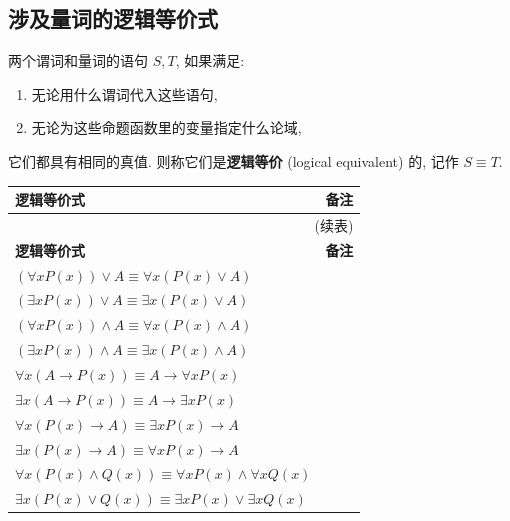 \documentclass[10pt,UTF8]{book} %
\begin{document}
\newpage
\subsection{涉及量词的逻辑等价式}

\begin{definition}
    两个谓词和量词的语句 $S,T$, 如果满足:
    \begin{enumerate}[label={${\arabic*}^\circ$}, itemsep=0pt]
        \item 无论用什么谓词代入这些语句,
        \item 无论为这些命题函数里的变量指定什么论域,
    \end{enumerate}
    它们都具有相同的真值. 则称它们是\textbf{逻辑等价} (logical equivalent) 的,
    记作 $S \equiv T$.
\end{definition}

{
\begin{longtable}{p{}p{}}
    \toprule 
    \textbf{逻辑等价式} & \textbf{备注} \\ 
    \midrule
    \endfirsthead
    \multicolumn{2}{r}{(续表)} \\
    \toprule 
    \textbf{逻辑等价式} & \textbf{备注} \\ 
    \midrule
    \endhead

    \bottomrule
    \endfoot

    $(\forall x P(x)) \vee A \equiv \forall x \left(
        P(x) \vee A
    \right)$ & \\
    $(\exists x P(x)) \vee A \equiv \exists x \left(
        P(x) \vee A
    \right)$ \\ 
    $(\forall x P(x)) \wedge A \equiv \forall x \left(
        P(x) \wedge A
    \right)$ & \\
    $(\exists x P(x)) \wedge A \equiv \exists x \left(
        P(x) \wedge A
    \right)$ \\ 
    $\forall x \left( A \to P(x) \right) \equiv A \to \forall x P(x)$ \\ 
    $\exists x \left( A \to P(x) \right) \equiv A \to \exists x P(x)$ \\ 
    $\forall x \left( P(x) \to A \right) \equiv \exists x P(x) \to A$ \\ 
    $\exists x \left( P(x) \to A \right) \equiv \forall x P(x) \to A$ \\ 
    $\forall x \left( P(x) \wedge Q(x) \right) \equiv
    \forall x P(x) \wedge \forall x Q(x)$ \\ 
    $\exists x \left( P(x) \vee Q(x) \right) \equiv
    \exists x P(x) \vee \exists x Q(x)$
\end{longtable}}
\end{document}
